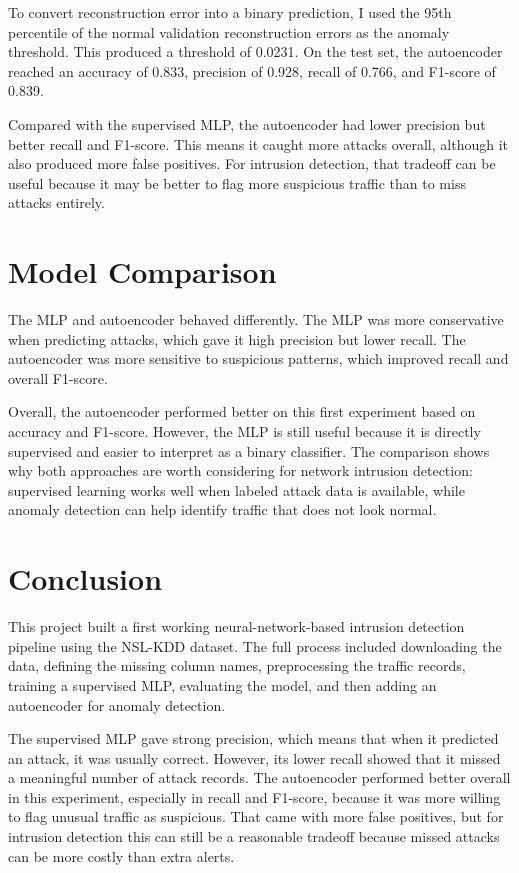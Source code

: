 \documentclass[11pt]{article}
\begin{document}
To convert reconstruction error into a binary prediction, I used the 95th percentile of the normal validation reconstruction errors as the anomaly threshold. This produced a threshold of 0.0231. On the test set, the autoencoder reached an accuracy of 0.833, precision of 0.928, recall of 0.766, and F1-score of 0.839.

Compared with the supervised MLP, the autoencoder had lower precision but better recall and F1-score. This means it caught more attacks overall, although it also produced more false positives. For intrusion detection, that tradeoff can be useful because it may be better to flag more suspicious traffic than to miss attacks entirely.

\section{Model Comparison}

The MLP and autoencoder behaved differently. The MLP was more conservative when predicting attacks, which gave it high precision but lower recall. The autoencoder was more sensitive to suspicious patterns, which improved recall and overall F1-score.

Overall, the autoencoder performed better on this first experiment based on accuracy and F1-score. However, the MLP is still useful because it is directly supervised and easier to interpret as a binary classifier. The comparison shows why both approaches are worth considering for network intrusion detection: supervised learning works well when labeled attack data is available, while anomaly detection can help identify traffic that does not look normal.

\section{Conclusion}

This project built a first working neural-network-based intrusion detection pipeline using the NSL-KDD dataset. The full process included downloading the data, defining the missing column names, preprocessing the traffic records, training a supervised MLP, evaluating the model, and then adding an autoencoder for anomaly detection.

The supervised MLP gave strong precision, which means that when it predicted an attack, it was usually correct. However, its lower recall showed that it missed a meaningful number of attack records. The autoencoder performed better overall in this experiment, especially in recall and F1-score, because it was more willing to flag unusual traffic as suspicious. That came with more false positives, but for intrusion detection this can still be a reasonable tradeoff because missed attacks can be more costly than extra alerts.
\end{document}
